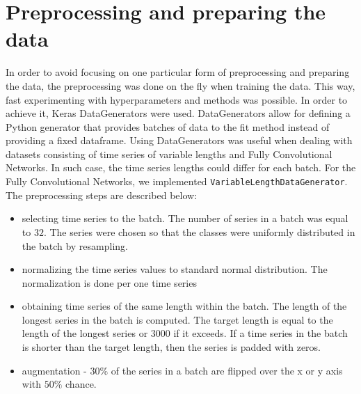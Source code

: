 \documentclass[a4paper,11pt,twoside]{report}
\theoremstyle{definition}
\begin{document}
\section{Preprocessing and preparing the data}\label{section:preprocessing}
 In order to avoid focusing on one particular form of preprocessing and preparing the data, the preprocessing was done on the fly when training the data. This way, fast experimenting with hyperparameters and methods was possible. In order to achieve it, Keras DataGenerators were used. DataGenerators allow for defining a Python generator that provides batches of data to the fit method instead of providing a fixed dataframe. Using DataGenerators was useful when dealing with datasets consisting of time series of variable lengths and Fully Convolutional Networks. In such case, the time series lengths could differ for each batch.
For the Fully Convolutional Networks, we implemented \texttt{VariableLengthDataGenerator}.
The preprocessing steps are described below:
\begin{itemize}
   \item selecting time series to the batch. The number of series in a batch was equal to $32$. The series were chosen so that the classes were uniformly distributed in the batch by resampling.
   \item normalizing the time series values to standard normal distribution. The normalization is done per one time series
   \item obtaining time series of the same length within the batch. The length of the longest series in the batch is computed. The target length is equal to the length of the longest series or $3000$ if it exceeds. If a time series in the batch is shorter than the target length, then the series is padded with zeros.

\item augmentation - $30\%$ of the series in a batch are flipped over the x or y axis with $50\%$ chance.

\end{itemize}
\end{document}
